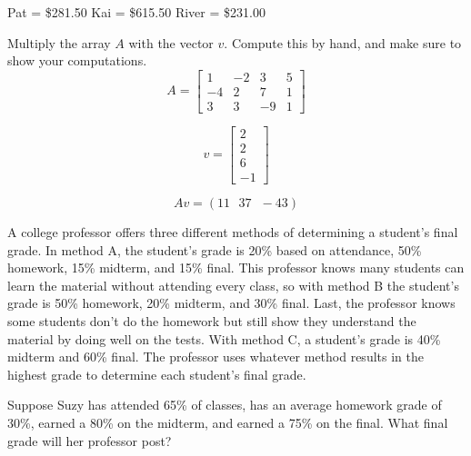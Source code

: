 Pat =  \$281.50 \newline
Kai =  \$615.50 \newline
River = \$231.00 \newline


\begin{Exercise}[title={Vector Matrix Multiplication}, label=vector-matrix-multiply01]
Multiply the array $A$ with the vector $v$. Compute this by hand, and make sure to show your computations. 
$$A = \begin{bmatrix}
1 & -2 & 3 & 5  \\
-4 & 2 & 7 & 1 \\
3 & 3  & -9 & 1
\end{bmatrix}$$

$$v = 
\begin{bmatrix}
 2 \\
 2 \\
 6 \\
 -1
 \end{bmatrix}$$
\end{Exercise}

\begin{Answer}[ref=vector-matrix-multiply01]
$$Av = (11 \text{ }37 \text{ } -43)$$
\end{Answer}

\begin{Exercise}[title = {Using Vector Matrix Multiplication}, label = vmm02]
A college professor offers three different methods of determining a student's final grade. In method A, the student's grade is 20\% based on attendance, 50\% homework, 15\% midterm, and 15\% final. This professor knows many students can learn the material without attending every class, so with method B the student's grade is 50\% homework, 20\% midterm, and 30\% final. Last, the professor knows some students don't do the homework but still show they understand the material by doing well on the tests. With method C, a student's grade is 40\% midterm and 60\% final. The professor uses whatever method results in the highest grade to determine each student's final grade. 

Suppose Suzy has attended 65\% of classes, has an average homework grade of 30\%, earned a 80\% on the midterm, and earned a 75\% on the final. What final grade will her professor post?
\end{Exercise}

